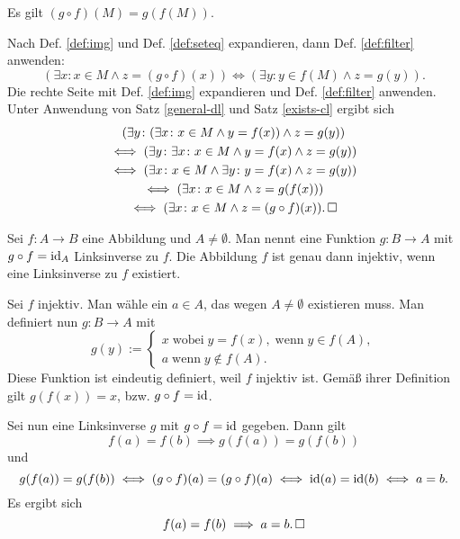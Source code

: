 \begin{Satz}\label{img-chain}
Es gilt $(g\circ f)(M) = g(f(M))$.
\end{Satz}
\begin{Beweis}
Nach Def. \ref{def:img} und Def. \ref{def:seteq} expandieren,
dann Def. \ref{def:filter} anwenden:%
\[(\exists x\colon x\in M\land z=(g\circ f)(x))
\iff (\exists y\colon y\in f(M)\land z=g(y)).\]
Die rechte Seite mit Def. \ref{def:img} expandieren und
Def. \ref{def:filter} anwenden. Unter Anwendung von
Satz \ref{general-dl} und Satz \ref{exists-cl} ergibt sich%
\begin{gather*}
(\exists y\colon (\exists x\colon x\in M\land y=f(x))\land z=g(y))\\
\iff (\exists y\colon\exists x\colon x\in M\land y=f(x)\land z=g(y))\\
\iff (\exists x\colon x\in M\land\exists y\colon y=f(x)\land z=g(y))\\
\iff (\exists x\colon x\in M\land z=g(f(x)))\\
\iff (\exists x\colon x\in M\land z=(g\circ f)(x)).\,\square
\end{gather*}
\end{Beweis}

\begin{Satz}\label{left-inverse}
Sei $f\colon A\to B$ eine Abbildung und $A\ne\emptyset$. Man nennt
eine Funktion $g\colon B\to A$ mit $g\circ f=\operatorname{id}_A$
Linksinverse
zu $f$. Die Abbildung $f$ ist genau dann injektiv, wenn eine
Linksinverse zu $f$ existiert.
\end{Satz}
\begin{Beweis}
Sei $f$ injektiv. Man wähle ein $a\in A$, das wegen $A\ne\emptyset$
existieren muss. Man definiert nun $g\colon B\to A$ mit%
\[g(y):=\begin{cases}
x\;\text{wobei}\;y=f(x),\;\text{wenn}\;y\in f(A),\\
a\;\text{wenn}\;y\notin f(A).
\end{cases}\]
Diese Funktion ist eindeutig definiert, weil $f$ injektiv ist.
Gemäß ihrer Definition gilt $g(f(x))=x$, bzw. $g\circ f = \operatorname{id}$.

Sei nun eine Linksinverse $g$ mit $g\circ f=\operatorname{id}$ gegeben. Dann gilt
\[f(a)=f(b) \implies g(f(a))=g(f(b))\]
und
\[g(f(a))=g(f(b))
\iff (g\circ f)(a)=(g\circ f)(a)
\iff \operatorname{id}(a)=\operatorname{id}(b)
\iff a=b.\]
Es ergibt sich
\[f(a)=f(b)\implies a=b.\,\square\]
\end{Beweis}

